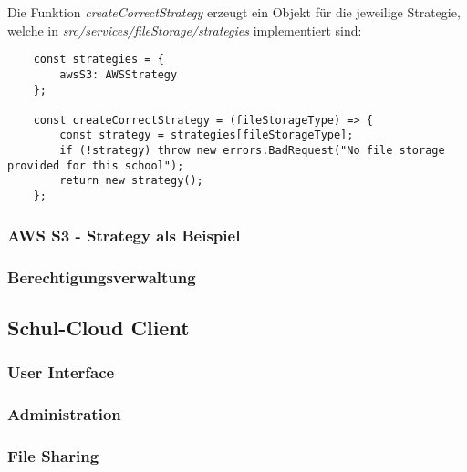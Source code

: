 Die Funktion \textit{createCorrectStrategy} erzeugt ein Objekt für die jeweilige Strategie, welche in \textit{src/services/fileStorage/strategies} implementiert sind:

\begin{lstlisting}
	const strategies = {
		awsS3: AWSStrategy
	};

	const createCorrectStrategy = (fileStorageType) => {
		const strategy = strategies[fileStorageType];
		if (!strategy) throw new errors.BadRequest("No file storage provided for this school");
		return new strategy();
	};
\end{lstlisting}

\subsubsection{AWS S3 - Strategy als Beispiel}


\subsubsection{Berechtigungsverwaltung}

\subsection{Schul-Cloud Client}

\subsubsection{User Interface}
\subsubsection{Administration}
\subsubsection{File Sharing}

\clearpage
